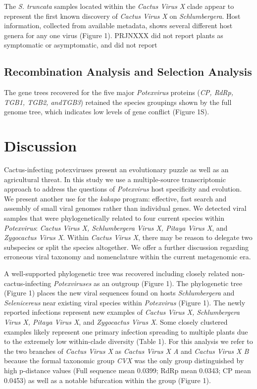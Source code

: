 \documentclass[fleqn,10pt,lineno]{wlpeerj}
\begin{document}
The \textit{S. truncata }samples located within the \textit{Cactus Virus X} clade appear to represent the first known discovery of \textit{Cactus Virus X} on \textit{Schlumbergera}.
Host information, collected from available metadata, shows several different host genera for any one virus (Figure 1).
PRJNXXX did not report plants as symptomatic or asymptomatic, and did not report 
 
\subsection*{Recombination Analysis and Selection Analysis}
The gene trees recovered for the five major \textit{Potexvirus} proteins (\textit{CP, RdRp, TGB1, TGB2, \textit{and}TGB3}) retained the species groupings shown by the full genome tree, which indicates low levels of gene conflict (Figure 1S).


\section*{Discussion}
Cactus-infecting potexviruses present an evolutionary puzzle as well as an agricultural threat. 
In this study we use a multiple-source transcriptomic approach to address the questions of \textit{Potexvirus} host specificity and evolution. 
We present another use for the \textit{kakapo} program: effective, fast search and assembly of small viral genomes rather than individual genes. 
We detected viral samples that were phylogenetically related to four current species within \textit{Potexvirus}: \textit{Cactus Virus X, Schlumbergera Virus X, Pitaya Virus X}, and \textit{Zygocactus Virus X}. 
Within \textit{Cactus Virus X}, there may be reason to delegate two subspecies or split the species altogether. 
We offer a further discussion regarding erroneous viral taxonomy and nomenclature within the current metagenomic era.

A well-supported phylogenetic tree was recovered including closely related non-cactus-infecting \textit{Potexviruses} as an outgroup (Figure 1).
The phylogenetic tree (Figure 1) places the new viral sequences found on hosts \textit{Schlumbergera} and \textit{Selenicereus} near existing viral species within \textit{Potexvirus} (Figure 1). 
The newly reported infections represent new examples of \textit{Cactus Virus X, Schlumbergera Virus X, Pitaya Virus X}, and \textit{Zygocactus Virus X}.
Some closely clustered examples likely represent one primary infection spreading to multiple plants due to the extremely low within-clade diversity (Table 1).
For this analysis we refer to the two branches of\textit{ Cactus Virus X }as \textit{Cactus Virus X A} and \textit{Cactus Virus X B} because the formal taxonomic group \textit{CVX} was the only group distinguished by high p-distance values (Full sequence mean 0.0399; RdRp mean 0.0343; CP mean 0.0453) as well as a notable bifurcation within the group (Figure 1).
\end{document}
